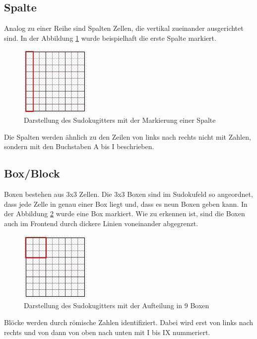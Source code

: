 \subsection{Spalte}
Analog zu einer Reihe sind Spalten Zellen, die vertikal zueinander ausgerichtet sind. In der Abbildung \ref{fig:SudokugitterSpalte} wurde beispielhaft die erste Spalte markiert.
\begin{figure}[htbp]
	\centering
	\includegraphics[width=0.3\textwidth]{images/sudokugitterSpalte.jpg}
	\caption{Darstellung des Sudokugitters mit der Markierung einer Spalte}
	\label{fig:SudokugitterSpalte}
\end{figure}
Die Spalten werden ähnlich zu den Zeilen von links nach rechts nicht mit Zahlen, sondern mit den Buchstaben A bis I beschrieben.

\subsection{Box/Block}
Boxen bestehen aus 3x3 Zellen. Die 3x3 Boxen sind im Sudokufeld so angeordnet, dass jede Zelle in genau einer Box liegt und, dass es neun Boxen geben kann. In der Abbildung \ref{fig:SudokugitterBox} wurde eine Box markiert. Wie zu erkennen ist, sind die Boxen auch im Frontend durch dickere Linien voneinander abgegrenzt. 
\begin{figure}[htbp]
	\centering
	\includegraphics[width=0.3\textwidth]{images/sudokugitterBox.jpg}
	\caption{Darstellung des Sudokugitters mit der Aufteilung in 9 Boxen}
	\label{fig:SudokugitterBox}
\end{figure}
Blöcke werden durch römische Zahlen identifiziert. Dabei wird erst von links nach rechts und von dann von oben nach unten mit I bis IX nummeriert.

